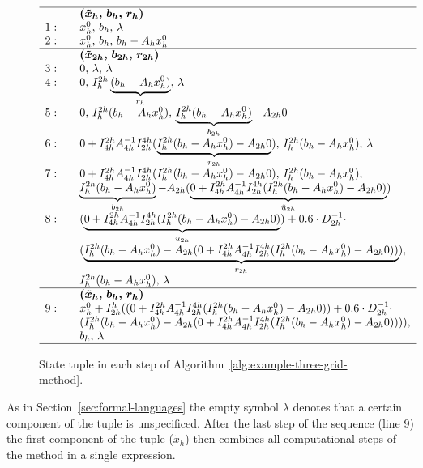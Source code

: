 \begin{figure}
	\begin{equation*}
		\begin{array}{l l}
			\hline
			& \quad \bm{(\tilde{x}_h, \, b_h, \, r_h)}  \\
			1: & \quad  x_{h}^0, \, b_h, \, \lambda \\
			2: & \quad  x_{h}^0, \, b_h, \, b_{h} - A_h x_{h}^0 \\ \hline
			& \quad \bm{(\tilde{x}_{2h}, \, b_{2h}, \, r_{2h})} \\
			3: & \quad  0, \, \lambda, \, \lambda \\
			4: & \quad  0, \, I_{h}^{2h}\underbrace{(b_{h} - A_h x_{h}^0)}_{r_{h}}, \, \lambda \\
			5: & \quad  0, \, I_{h}^{2h}(b_{h} - A_h x_{h}^0), \,\underbrace{I_{h}^{2h}(b_{h} - A_h x_{h}^0)}_{b_{2h}} - A_{2h} 0 \\
			6: & \quad 0 + I_{4h}^{2h} A_{4h}^{-1} I_{2h}^{4h} (\underbrace{I_{h}^{2h}(b_{h} - A_h x_{h}^0) - A_{2h} 0}_{r_{2h}}), \, I_{h}^{2h}(b_{h} - A_h x_{h}^0), \, \lambda\\
			7: & \quad 0 + I_{4h}^{2h} A_{4h}^{-1} I_{2h}^{4h} (I_{h}^{2h}(b_{h} - A_h x_{h}^0) - A_{2h} 0), \, I_{h}^{2h}(b_{h} - A_h x_{h}^0), \\ & \quad \underbrace{I_{h}^{2h}(b_{h} - A_h x_{h}^0)}_{b_{2h}} - A_{2h} (\underbrace{0 + I_{4h}^{2h} A_{4h}^{-1} I_{2h}^{4h} (I_{h}^{2h}(b_{h} - A_h x_{h}^0) - A_{2h} 0)}_{\tilde{u}_{2h}}) \\
			8: & \quad  (\underbrace{0 + I_{4h}^{2h} A_{4h}^{-1} I_{2h}^{4h} (I_{h}^{2h}(b_{h} - A_h x_{h}^0) - A_{2h} 0)}_{\tilde{u}_{2h}}) + 0.6 \cdot D_{2h}^{-1} \cdot \\ 
			& \quad (\underbrace{I_{h}^{2h}(b_{h} - A_h x_{h}^0) - A_{2h} (0 + I_{4h}^{2h} A_{4h}^{-1} I_{2h}^{4h} (I_{h}^{2h}(b_{h} - A_h x_{h}^0) - A_{2h} 0))}_{r_{2h}}), \\ 
			& \quad I_{h}^{2h}(b_{h} - A_h x_{h}^0), \, \lambda \\ \hline 
			& \quad \bm{(\tilde{x}_h, \, b_h, \, r_h)}  \\
			9: & \quad x_{h}^0 + I_{2h}^h ((0 + I_{4h}^{2h} A_{4h}^{-1} I_{2h}^{4h} (I_{h}^{2h}(b_{h} - A_h x_{h}^0) - A_{2h} 0)) + 0.6 \cdot D_{2h}^{-1} \cdot \\ & \quad (I_{h}^{2h}(b_{h} - A_h x_{h}^0) - A_{2h} (0 + I_{4h}^{2h} A_{4h}^{-1} I_{2h}^{4h} (I_{h}^{2h}(b_{h} - A_h x_{h}^0) - A_{2h} 0)))), \\ & \quad b_h, \, \lambda \\
			\hline
		\end{array}
	\end{equation*}
	\caption{State tuple in each step of Algorithm~\ref{alg:example-three-grid-method}.}
	\label{fig:example-tree-grid-method-states}
\end{figure}
As in Section~\ref{sec:formal-languages} the empty symbol $\lambda$ denotes that a certain component of the tuple is unspecificed.
After the last step of the sequence (line 9) the first component of the tuple ($\tilde{x}_h$) then combines all computational steps of the method in a single expression.

